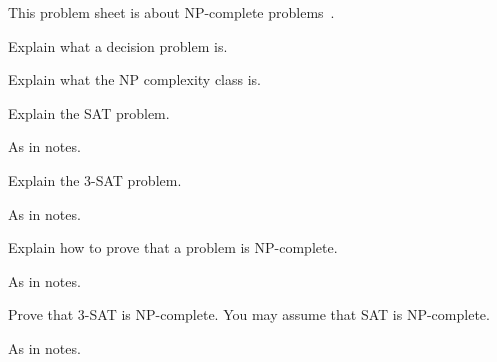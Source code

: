 

\noindent
This problem sheet is about NP-complete problems~\cite{sipserbook}.

\begin{questions}

\question
Explain what a decision problem is.

\question
Explain what the NP complexity class is. 


\question
Explain the SAT problem.
\begin{solution}
As in notes.
\end{solution}

\question
Explain the 3-SAT problem.
\begin{solution}
As in notes.
\end{solution}

\question
Explain how to prove that a problem is NP-complete.
\begin{solution}
As in notes.
\end{solution}


\question
Prove that 3-SAT is NP-complete. You may assume that SAT is NP-complete.
\begin{solution}
As in notes.
\end{solution}

\end{questions}
